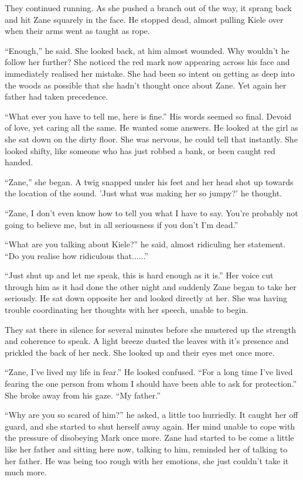 They continued running.  As she pushed a branch out of the way, it sprang back and hit Zane squarely in the face.  He stopped dead, almost pulling Kiele over when their arms went as taught as rope.  

``Enough,'' he said.  She looked back, at him almost wounded.  Why wouldn't he follow her further?  She noticed the red mark now appearing across his face and immediately realised her mistake.  She had been so intent on getting as deep into the woods as possible that she hadn't thought once about Zane.  Yet again her father had taken precedence.  

``What ever you have to tell me, here is fine.''  His words seemed so final.  Devoid of love, yet caring all the same.  He wanted some answers.  He looked at the girl as she sat down on the dirty floor.  She was nervous, he could tell that instantly.  She looked shifty, like someone who has just robbed a bank, or been caught red handed.

``Zane,'' she began.  A twig snapped under his feet and her head shot up towards the location of the sound.  'Just what was making her so jumpy?' he thought.  

``Zane, I don't even know how to tell you what I have to say.  You're probably not going to believe me, but in all seriousness if you don't I'm dead.''

``What are you talking about Kiele?'' he said, almost ridiculing her statement.  ``Do you realise how ridiculous that......''

``Just shut up and let me speak, this is hard enough as it is.''  Her voice cut through him as it had done the other night and suddenly Zane began to take her seriously.  He sat down opposite her and looked directly at her.  She was having trouble coordinating her thoughts with her speech, unable to begin.

They sat there in silence for several minutes before she mustered up the strength and coherence to speak.  A light breeze dusted the leaves with it's presence and prickled the back of her neck.  She looked up and their eyes met once more.

``Zane, I've lived my life in fear.''  He looked confused.  ``For a long time I've lived fearing the one person from whom I should have been able to ask for protection.''  She broke away from his gaze.  ``My father.''

``Why are you so scared of him?'' he asked, a little too hurriedly.  It caught her off guard, and she started to shut herself away again.  Her mind unable to cope with the pressure of disobeying Mark once more.  Zane had started to be come a little like her father and sitting here now, talking to him, reminded her of talking to her father.  He was being too rough with her emotions, she just couldn't take it much more.

